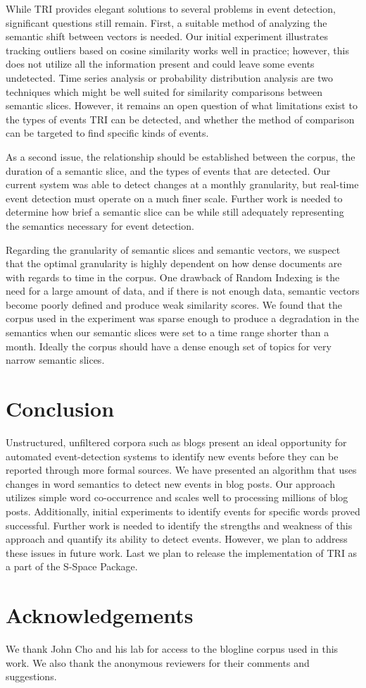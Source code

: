 \documentclass[a4paper,twocolumn,twoside,10pt]{ranlp}
\begin{document}
While TRI provides elegant solutions to several problems in event detection,
significant questions still remain.  First, a suitable method of analyzing the
semantic shift between vectors is needed.  Our initial experiment illustrates
tracking outliers based on cosine similarity works well in practice; however,
this does not utilize all the information present and could leave some events
undetected.  Time series analysis or probability distribution analysis are two
techniques which might be well suited for similarity comparisons between
semantic slices.
However, it remains an open question of what limitations exist to the types of
events TRI can be detected, and whether the method of comparison can be targeted
to find specific kinds of events.

As a second issue, the relationship should be established between the corpus,
the duration of a semantic slice, and the types of events that are detected.
Our current system was able to detect changes at a monthly granularity, but
real-time event detection must operate on a much finer scale.  Further work is
needed to determine how brief a semantic slice can be while still adequately
representing the semantics necessary for event detection.

Regarding the granularity of semantic slices and semantic vectors, we suspect
that the optimal granularity is highly dependent on how dense documents are with
regards to time in the corpus.  One drawback of Random Indexing is the need for
a large amount of data, and if there is not enough data, semantic vectors become
poorly defined and produce weak similarity scores.  We found that the corpus
used in the experiment was sparse enough to produce a degradation in the
semantics when our semantic slices were set to a time range shorter than a
month.  Ideally the corpus should have a dense enough set of topics for very
narrow semantic slices.

\section{Conclusion}

Unstructured, unfiltered corpora such as blogs present an ideal opportunity for
automated event-detection systems to identify new events before they can be
reported through more formal sources.  We have presented an algorithm that uses
changes in word semantics to detect new events in blog posts.  Our approach
utilizes simple word co-occurrence and scales well to processing millions of
blog posts.  Additionally, initial experiments to identify events for specific
words proved successful.  Further work is needed to identify the strengths and
weakness of this approach and quantify its ability to detect events.  However,
we plan to address these issues in future work.  Last we plan to release the
implementation of TRI as a part of the S-Space Package\cite{jurgens09sspace}.

\section*{Acknowledgements}

We thank John Cho and his lab for access to the blogline corpus used in this
work.  We also thank the anonymous reviewers for their comments and suggestions.

 
\end{document}
